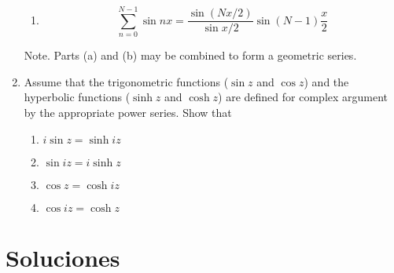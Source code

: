 \documentclass[12pt,spanish]{article}
\begin{document}
\begin{enumerate}
\begin{enumerate}
        \item
            \begin{equation*}
                \sum_{n = 0}^{ N - 1} \sin{nx} = \frac{\sin{(Nx/2)}}{\sin{x/2}}\sin{(N-1)}\frac{x}{2}
            \end{equation*}
    \end{enumerate}

    Note. Parts (a) and (b) may be combined to form a geometric series.

    \item  Assume that the trigonometric functions ($\sin{z}$ and $\cos{z}$) and the hyperbolic functions ($\sinh{z}$ and $\cosh{z}$) are defined for complex argument by the appropriate power series. Show that

  \begin{enumerate}
    \item $i\sin{z} = \sinh{iz}$
    \item $\sin{iz} = i\sinh{z}$
    \item $\cos{z} = \cosh{iz}$
    \item $\cos{iz} = \cosh{z}$
  \end{enumerate}

\end{enumerate}

\section*{Soluciones}
\end{document}
